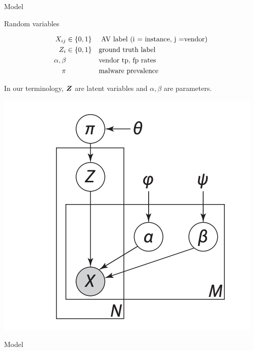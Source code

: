 \documentclass[10pt]{beamer}
\begin{document}
\begin{frame}{Model}
\footnotesize
\begin{sblock}{Random variables}

\begin{minipage}{.6\textwidth}
\begin{align*}
X_{ij} & \in \{ {0,1} \} && \text{ AV label (i = instance, j =vendor)} \\
Z_i & \in \{ {0,1} \} && \text{ground truth label} \\
\alpha, \beta & && \text{vendor tp, fp rates} \\
\pi & && \text{malware prevalence} 
\end{align*}

In our terminology, ${\boldsymbol Z}$ are latent variables and $\alpha, \beta$ are parameters.
\end{minipage}
\hfill
\begin{minipage}{.35\textwidth}
\begin{center}
\includegraphics[width=.7\textwidth]{images/kantchelian_pgm}
\end{center}
\end{minipage}


\end{sblock}

\begin{sblock}{Model}


\end{sblock}
\end{frame}
\end{document}
